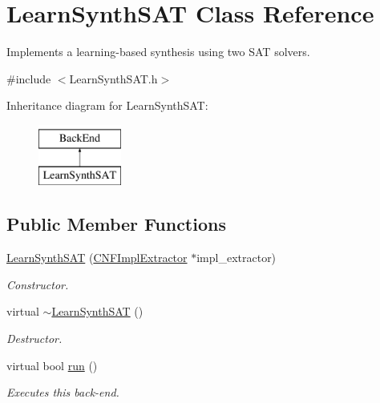 \hypertarget{classLearnSynthSAT}{\section{Learn\-Synth\-S\-A\-T Class Reference}
\label{classLearnSynthSAT}
}


Implements a learning-\/based synthesis using two S\-A\-T solvers.  




{\ttfamily \#include $<$Learn\-Synth\-S\-A\-T.\-h$>$}

Inheritance diagram for Learn\-Synth\-S\-A\-T\-:\begin{figure}[H]
\begin{center}
\leavevmode
\includegraphics[height=2.000000cm]{classLearnSynthSAT}
\end{center}
\end{figure}
\subsection*{Public Member Functions}
\begin{DoxyCompactItemize}
\item 
\hyperlink{classLearnSynthSAT_a5620cd59d05720b9a148077d86efa2a8}{Learn\-Synth\-S\-A\-T} (\hyperlink{classCNFImplExtractor}{C\-N\-F\-Impl\-Extractor} $\ast$impl\-\_\-extractor)
\begin{DoxyCompactList}\small\item\em Constructor. \end{DoxyCompactList}\item 
virtual \hyperlink{classLearnSynthSAT_a2cb64f16d981276fe946d0fa0cf0bd09}{$\sim$\-Learn\-Synth\-S\-A\-T} ()
\begin{DoxyCompactList}\small\item\em Destructor. \end{DoxyCompactList}\item 
virtual bool \hyperlink{classLearnSynthSAT_a13a50b2649f44d37761fdbff26e9c0c0}{run} ()
\begin{DoxyCompactList}\small\item\em Executes this back-\/end. \end{DoxyCompactList}\end{DoxyCompactItemize}
